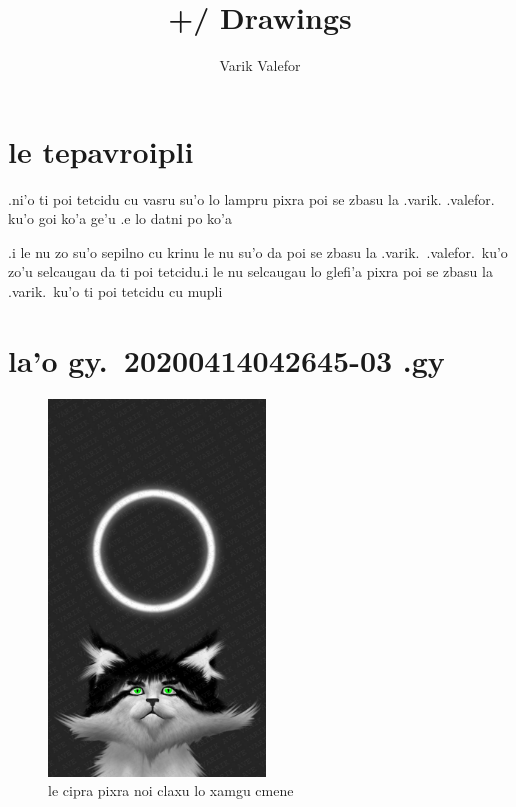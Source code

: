 \documentclass{report}
\title{+/ Drawings}
\author{Varik Valefor}
\newcommand\imageheight{10cm}
\begin{document}
\maketitle{}
\tableofcontents{}
\chapter{le tepavroipli}
.ni'o ti poi tetcidu cu vasru su'o lo lampru pixra poi se zbasu la .varik. .valefor. ku'o goi ko'a ge'u .e lo datni po ko'a

.i le nu zo su'o sepilno cu krinu le nu su'o da poi se zbasu la .varik.\ .valefor.\ ku'o zo'u selcaugau da ti poi tetcidu\@  .i le nu selcaugau lo glefi'a pixra poi se zbasu la .varik.\ ku'o ti poi tetcidu cu mupli
\chapter{la'o gy.\ 20200414042645-03 .gy}
\begin{figure}[ht]
	\centering
	\includegraphics[height=\imageheight]{20200414042645-03/20200414042645-03.jpg}
	\caption[center]{le cipra pixra noi claxu lo xamgu cmene}
\end{figure}
\end{document}
